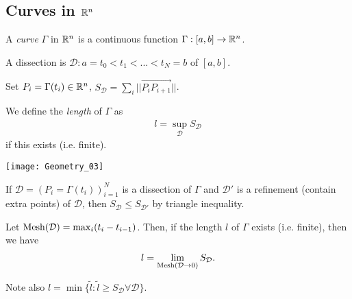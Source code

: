 \documentclass[a4paper]{article}
\begin{document}
\subsection{Curves in $\mathbb{R}^n$}
\begin{defi}
A \emph{curve} $\Gamma$ in $\mathbb{R}^n$ is a continuous function $\Gamma: [a,b] \to \mathbb{R}^n$.

A dissection is $\mathcal{D}:a = t_0<t_1<...<t_N = b$ of $[a,b]$.

Set $P_i = \Gamma(t_i) \in \mathbb{R}^n$, $S_\mathcal{D} = \sum_i ||\vec{P_i P_{i+1}}||$.

We define the \emph{length} of $\Gamma$ as
\begin{equation*}
\begin{aligned}
l=\sup_\mathcal{D} S_\mathcal{D}
\end{aligned}
\end{equation*}
if this exists (i.e. finite).

\texttt{[image: Geometry\_03]}

If $\mathcal{D} = (P_i = \Gamma(t_i))_{i=1}^N$ is a dissection of $\Gamma$ and $\mathcal{D}'$ is a refinement (contain extra points) of $\mathcal{D}$, then $S_\mathcal{D} \leq S_\mathcal{D'}$ by triangle inequality.

Let $\operatorname{Mesh}(\mathcal{D}) = \max_i (t_i-t_{i-1})$. Then, if the length $l$ of $\Gamma$ exists (i.e. finite), then we have
\begin{equation*}
\begin{aligned}
l = \lim_{\operatorname{Mesh}(\mathcal{D} \to 0)} S_\mathcal{D}.
\end{aligned}
\end{equation*}

Note also $l = \min\{\tilde{l}: \tilde{l} \geq S_\mathcal{D} \forall \mathcal{D}\}$.

\end{defi}
\end{document}
